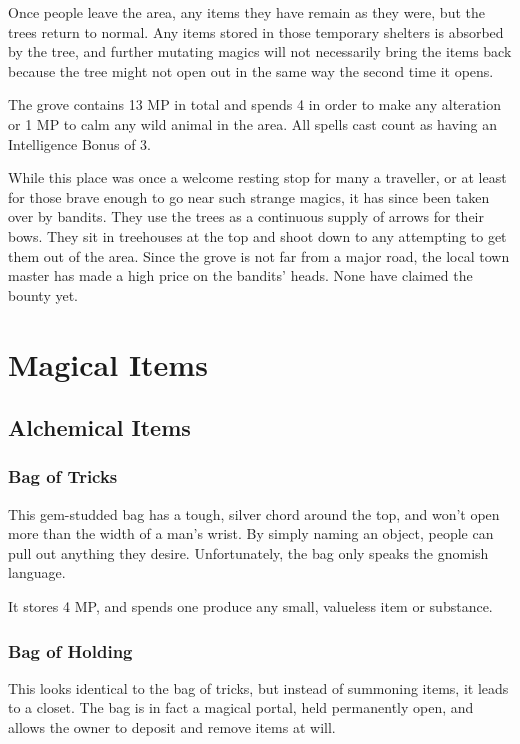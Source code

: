 Once people leave the area, any items they have remain as they were, but the trees return to normal.  Any items stored in those temporary shelters is absorbed by the tree, and further mutating magics will not necessarily bring the items back because the tree might not open out in the same way the second time it opens.

The grove contains 13 MP in total and spends 4 in order to make any alteration or 1 MP to calm any wild animal in the area.  All spells cast count as having an Intelligence Bonus of 3.

While this place was once a welcome resting stop for many a traveller, or at least for those brave enough to go near such strange magics, it has since been taken over by bandits.  They use the trees as a continuous supply of arrows for their bows.  They sit in treehouses at the top and shoot down to any attempting to get them out of the area.  Since the grove is not far from a major road, the local town master has made a high price on the bandits' heads.  None have claimed the bounty yet.

\section{Magical Items}

\subsection{Alchemical Items}

\subsubsection{Bag of Tricks}
This gem-studded bag has a tough, silver chord around the top, and won't open more than the width of a man's wrist.  By simply naming an object, people can pull out anything they desire.  Unfortunately, the bag only speaks the gnomish language.

It stores 4 MP, and spends one produce any small, valueless item or substance.

\subsubsection{Bag of Holding}
This looks identical to the bag of tricks, but instead of summoning items, it leads to a closet.  The bag is in fact a magical portal, held permanently open, and allows the owner to deposit and remove items at will.


